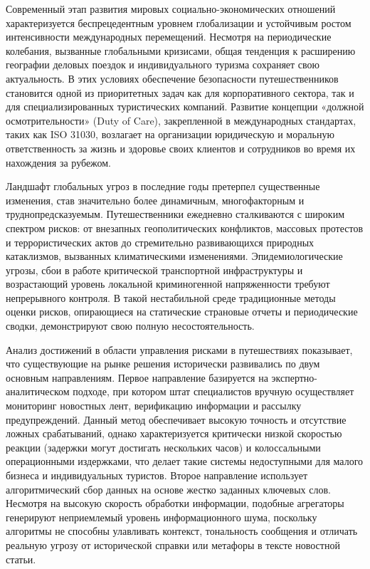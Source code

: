 
Современный этап развития мировых социально-экономических отношений характеризуется беспрецедентным уровнем глобализации и устойчивым ростом интенсивности международных перемещений. Несмотря на периодические колебания, вызванные глобальными кризисами, общая тенденция к расширению географии деловых поездок и индивидуального туризма сохраняет свою актуальность. В этих условиях обеспечение безопасности путешественников становится одной из приоритетных задач как для корпоративного сектора, так и для специализированных туристических компаний. Развитие концепции «должной осмотрительности» (Duty of Care), закрепленной в международных стандартах, таких как ISO 31030, возлагает на организации юридическую и моральную ответственность за жизнь и здоровье своих клиентов и сотрудников во время их нахождения за рубежом.

Ландшафт глобальных угроз в последние годы претерпел существенные изменения, став значительно более динамичным, многофакторным и труднопредсказуемым. Путешественники ежедневно сталкиваются с широким спектром рисков: от внезапных геополитических конфликтов, массовых протестов и террористических актов до стремительно развивающихся природных катаклизмов, вызванных климатическими изменениями. Эпидемиологические угрозы, сбои в работе критической транспортной инфраструктуры и возрастающий уровень локальной криминогенной напряженности требуют непрерывного контроля. В такой нестабильной среде традиционные методы оценки рисков, опирающиеся на статические страновые отчеты и периодические сводки, демонстрируют свою полную несостоятельность.

Анализ достижений в области управления рисками в путешествиях показывает, что существующие на рынке решения исторически развивались по двум основным направлениям. Первое направление базируется на экспертно-аналитическом подходе, при котором штат специалистов вручную осуществляет мониторинг новостных лент, верификацию информации и рассылку предупреждений. Данный метод обеспечивает высокую точность и отсутствие ложных срабатываний, однако характеризуется критически низкой скоростью реакции (задержки могут достигать нескольких часов) и колоссальными операционными издержками, что делает такие системы недоступными для малого бизнеса и индивидуальных туристов. Второе направление использует алгоритмический сбор данных на основе жестко заданных ключевых слов. Несмотря на высокую скорость обработки информации, подобные агрегаторы генерируют неприемлемый уровень информационного шума, поскольку алгоритмы не способны улавливать контекст, тональность сообщения и отличать реальную угрозу от исторической справки или метафоры в тексте новостной статьи.

